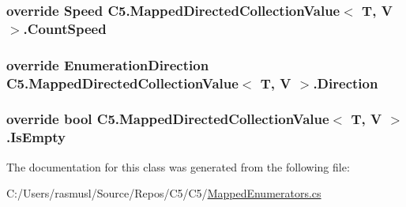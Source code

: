 \subsubsection[{Count\+Speed}]{\setlength{\rightskip}{0pt plus 5cm}override {\bf Speed} {\bf C5.\+Mapped\+Directed\+Collection\+Value}$<$ T, V $>$.Count\+Speed\hspace{0.3cm}{\ttfamily [get]}}\label{class_c5_1_1_mapped_directed_collection_value_a90ad5409e3ab27e7bf56d213b7a3f1bc}
\hypertarget{class_c5_1_1_mapped_directed_collection_value_aa5c1d848e4e69eab4e5f19def239e266}{}
\subsubsection[{Direction}]{\setlength{\rightskip}{0pt plus 5cm}override {\bf Enumeration\+Direction} {\bf C5.\+Mapped\+Directed\+Collection\+Value}$<$ T, V $>$.Direction\hspace{0.3cm}{\ttfamily [get]}}\label{class_c5_1_1_mapped_directed_collection_value_aa5c1d848e4e69eab4e5f19def239e266}
\hypertarget{class_c5_1_1_mapped_directed_collection_value_a05af9a255a6361eb61106f1ec5316162}{}
\subsubsection[{Is\+Empty}]{\setlength{\rightskip}{0pt plus 5cm}override bool {\bf C5.\+Mapped\+Directed\+Collection\+Value}$<$ T, V $>$.Is\+Empty\hspace{0.3cm}{\ttfamily [get]}}\label{class_c5_1_1_mapped_directed_collection_value_a05af9a255a6361eb61106f1ec5316162}


The documentation for this class was generated from the following file\+:\begin{DoxyCompactItemize}
\item 
C\+:/\+Users/rasmusl/\+Source/\+Repos/\+C5/\+C5/\hyperlink{_mapped_enumerators_8cs}{Mapped\+Enumerators.\+cs}\end{DoxyCompactItemize}
